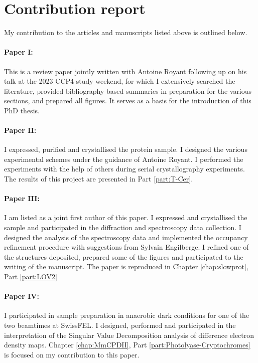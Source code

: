 \documentclass{report}
\begin{document}
\pagebreak
\section*{Contribution report}

My contribution to the articles and manuscripts listed above is outlined below.  


\paragraph{Paper I:} This is a review paper jointly written with Antoine Royant following up on  his talk at the 2023 CCP4 study weekend, for which I extensively searched the literature, provided bibliography-based summaries in preparation for the various sections, and prepared all figures. It serves as a basis for the introduction of this PhD thesis.

\paragraph{Paper II:} I expressed, purified and crystallised the protein sample. I designed the various experimental schemes under the guidance of Antoine Royant. I performed the experiments with the help of others during serial crystallography experiments. The results of this project are presented in Part \ref{part:T-Cer}. 

\paragraph{Paper III:} I am listed as a joint first author of this paper. I expressed and crystallised the sample and participated in the diffraction and spectroscopy data collection. I designed the analysis of the spectroscopy data and implemented the occupancy refinement procedure with suggestions from Sylvain Engilberge. I refined one of the structures deposited, prepared some of the figures and participated to the writing of the manuscript. The paper is reproduced in Chapter \ref{chap:slowprot}, Part \ref{part:LOV2}

\paragraph{Paper IV:} I participated in sample preparation in anaerobic dark conditions for one of the two beamtimes at SwissFEL. I designed, performed and participated in the interpretation of the Singular Value Decomposition analysis of difference electron density maps. Chapter \ref{chap:MmCPDII}, Part \ref{part:Photolyase-Cryptochromes} is focused on my contribution to this paper.
\end{document}
